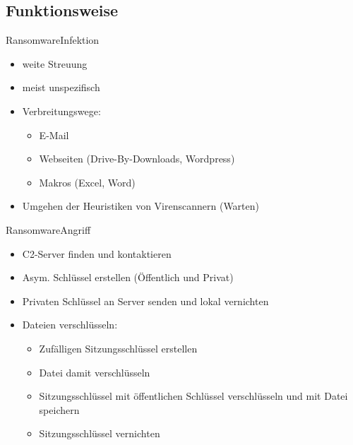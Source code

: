 \documentclass[10pt]{beamer}
\begin{document}
\subsection{Funktionsweise}
\begin{frame}{Ransomware}{Infektion}
		\begin{itemize}
			\item weite Streuung
			\item meist unspezifisch
			\item Verbreitungswege:
				\begin{itemize}
					\item E-Mail
					\item Webseiten (Drive-By-Downloads, Wordpress)
					\item Makros (Excel, Word)
				\end{itemize}
			\item Umgehen der Heuristiken von Virenscannern (Warten)
		\end{itemize}
\end{frame}
\begin{frame}{Ransomware}{Angriff}
		\begin{itemize}
			\item C2-Server finden und kontaktieren
			\item Asym. Schlüssel erstellen (Öffentlich und Privat)
			\item Privaten Schlüssel an Server senden und lokal vernichten
			\item Dateien verschlüsseln:
				\begin{itemize}
					\item Zufälligen Sitzungsschlüssel erstellen
					\item Datei damit verschlüsseln
					\item Sitzungsschlüssel mit öffentlichen Schlüssel verschlüsseln und mit Datei speichern
					\item Sitzungsschlüssel vernichten
				\end{itemize}
		\end{itemize}
\end{frame}
\end{document}
